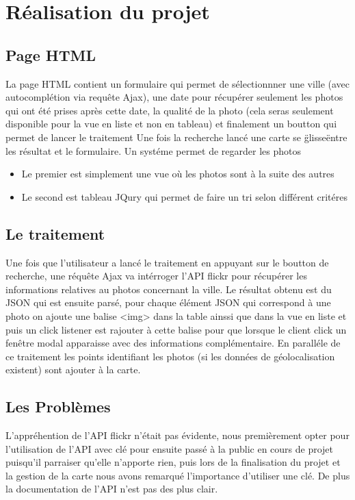 \documentclass[a4paper, 11pt]{article}
\begin{document}
\section*{Réalisation du projet}

	\subsection*{Page HTML }
	La page HTML contient un formulaire qui permet de sélectionnner une ville (avec autocomplétion via requête Ajax), une date pour récupérer seulement les photos qui ont été prises après cette date, la qualité de la photo (cela seras seulement disponible pour la vue en liste et non en tableau) et finalement un boutton qui permet de lancer le traitement
	Une fois la recherche lancé une carte se \"glisse\" entre les résultat et le formulaire.
	Un systéme permet de regarder les photos
	\begin{itemize}
		\item Le premier est simplement une vue où les photos sont à la suite des autres
		\item Le second est tableau JQury qui permet de faire un tri selon différent critéres
	\end{itemize}
	\subsection*{Le traitement}
	Une fois que l'utilisateur a lancé le traitement en appuyant sur le boutton de recherche, une réquête Ajax va intérroger l'API flickr pour récupérer les informations relatives au photos concernant la ville.
	Le résultat obtenu est du JSON qui est ensuite parsé, pour chaque élément JSON qui correspond à une photo on ajoute une balise <img> dans la table ainssi que dans la vue en liste et puis un click listener est rajouter à cette balise pour que lorsque le client click un fenêtre modal apparaisse avec des informations complémentaire.
	En paralléle de ce traitement les points identifiant les photos (si les données de géolocalisation existent) sont ajouter à la carte.
	\subsection*{Les Problèmes}
	L'appréhention de l'API flickr n'était pas évidente, nous premièrement opter pour l'utilisation de l'API avec clé pour ensuite passé à la public en cours de projet puisqu'il parraiser qu'elle n'apporte rien, puis lors de la finalisation du projet et la gestion de la carte nous avons remarqué l'importance d'utiliser une clé. 
	De plus la documentation de l'API n'est pas des plus clair.
\end{document}
